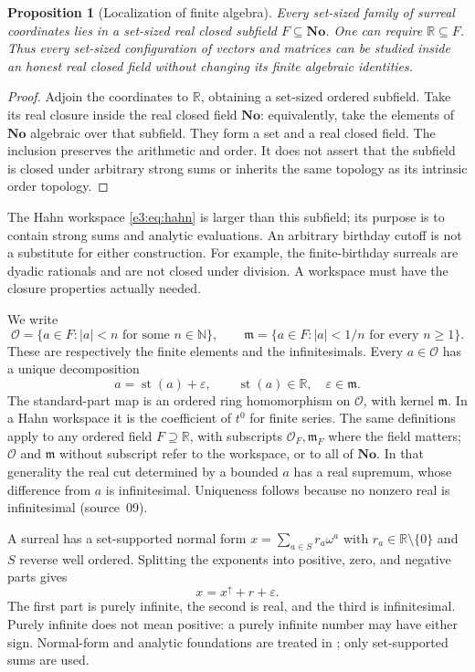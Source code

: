 \documentclass[11pt,letterpaper]{article}
\numberwithin{equation}{section}
\newtheorem{proposition}[proposition]{Proposition}
\theoremstyle{definition}
\theoremstyle{remark}
\newcommand{\No}{\mathbf{No}}
\newcommand{\R}{\mathbb R}
\newcommand{\N}{\mathbb N}
\newcommand{\OO}{\mathcal O}
\newcommand{\mm}{\mathfrak m}
\newcommand{\eps}{\varepsilon}
\newcommand{\st}{\operatorname{st}}
\begin{document}
\begin{proposition}[Localization of finite algebra]\label{e3:so:prop:localization}
Every set-sized family of surreal coordinates lies in a set-sized real closed
subfield $F\subseteq\No$. One can require $\R\subseteq F$. Thus every
set-sized configuration of vectors and matrices can be studied inside an honest
real closed field without changing its finite algebraic identities.
\end{proposition}
\begin{proof}
Adjoin the coordinates to $\R$, obtaining a set-sized ordered subfield.
Take its real closure inside the real closed field $\No$: equivalently, take
the elements of $\No$ algebraic over that subfield. They form a set and a
real closed field. The inclusion preserves the arithmetic and order. It does
not assert that the subfield is closed under arbitrary strong sums or inherits
the same topology as its intrinsic order topology.
\end{proof}

The Hahn workspace \cref{e3:eq:hahn} is larger than this subfield; its purpose
is to contain strong sums and analytic evaluations. An arbitrary birthday
cutoff is not a substitute for either construction. For example, the
finite-birthday surreals are dyadic rationals and are not closed under
division. A workspace must have the closure properties actually needed.

We write
\[
 \OO=\{a\in F: |a|<n\text{ for some }n\in\N\},\qquad
 \mm=\{a\in F: |a|<1/n\text{ for every }n\ge1\}.
\]
These are respectively the finite elements and the infinitesimals. Every
$a\in\OO$ has a unique decomposition
\[
 a=\st(a)+\eps,\qquad \st(a)\in\R,\quad\eps\in\mm.
\]
The standard-part map is an ordered ring homomorphism on $\OO$, with kernel
$\mm$. In a Hahn workspace it is the coefficient of $t^0$ for finite series.
The same definitions apply to any ordered field $F\supseteq\R$, with
subscripts $\OO_F,\mm_F$ where the field matters; $\OO$ and $\mm$ without
subscript refer to the workspace, or to all of $\No$. In that generality the
real cut determined by a bounded $a$ has a real supremum, whose difference from
$a$ is infinitesimal. Uniqueness follows because no nonzero real is
infinitesimal (source~09).

A surreal has a set-supported normal form
$x=\sum_{a\in S} r_a\omega^a$ with $r_a\in\R\setminus\{0\}$ and $S$ reverse
well ordered. Splitting the exponents into positive, zero, and negative parts
gives
\begin{equation}\label{e3:so:eq:threeparts}
 x=x^\uparrow+r+\eps .
\end{equation}
The first part is purely infinite, the second is real, and the third is
infinitesimal. Purely infinite does not mean positive: a purely infinite number
may have either sign. Normal-form and analytic foundations are treated in
\cite{vdDE,EK}; only set-supported sums are used.
\end{document}
